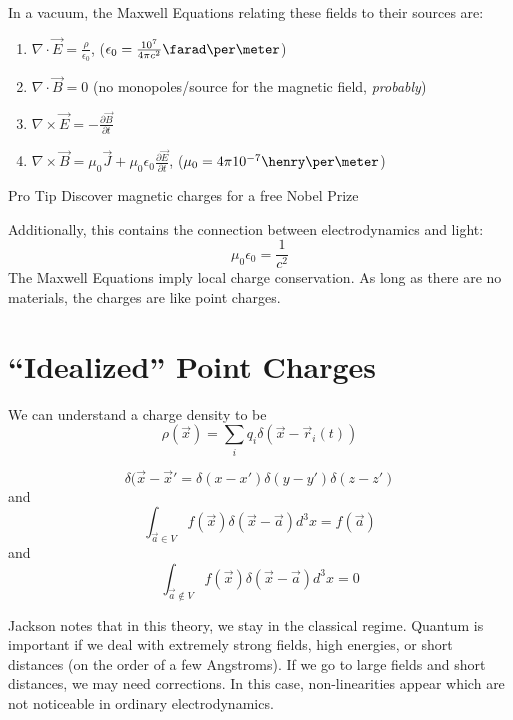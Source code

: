 \documentclass[twoside,master.tex]{subfiles}
\begin{document}
In a vacuum, the Maxwell Equations relating these fields to their sources are:
\begin{enumerate}
    \item $\nabla\cdot \vec{E} = \frac{\rho}{\epsilon_0}$, ($\epsilon_0 = \frac{10^{7}}{4\pi c^2}\farad\per\meter$)
    \item $\nabla \cdot \vec{B} = 0$ (no monopoles/source for the magnetic field, \textit{probably})
    \item $\nabla \times \vec{E} = -\frac{\partial \vec{B}}{\partial t}$
    \item $ \nabla \times \vec{B} = \mu_0 \vec{J} + \mu_0\epsilon_0 \frac{\partial \vec{E}}{\partial t}$, ($\mu_0 = 4\pi 10^{-7}\henry\per\meter$)
\end{enumerate}
\begin{note}{Pro Tip}
    Discover magnetic charges for a free Nobel Prize
\end{note}
Additionally, this contains the connection between electrodynamics and light:
\begin{equation}
    \mu_0\epsilon_0 = \frac{1}{c^2}
\end{equation}
The Maxwell Equations imply local charge conservation. As long as there are no materials, the charges are like point charges.

\section{``Idealized'' Point Charges}%
\label{sec:_idealized_point_charges_}
We can understand a charge density to be
\begin{equation}
    \rho(\vec{x}) = \sum_i q_i\delta(\vec{x}-\vec{r}_i(t))
\end{equation}
\begin{remark}
    \begin{equation}
        \delta(\vec{x}-\vec{x}' = \delta(x-x')\delta(y-y')\delta(z-z')
    \end{equation}
    and
    \begin{equation}
        \int_{\vec{a}\in V} f(\vec{x})\delta(\vec{x}-\vec{a})d^3x = f(\vec{a})
    \end{equation}
    and
    \begin{equation}
        \int_{\vec{a}\not\in V}f(\vec{x})\delta(\vec{x}-\vec{a})d^3x = 0
    \end{equation}
\end{remark}
Jackson notes that in this theory, we stay in the classical regime. Quantum is important if we deal with extremely strong fields, high energies, or short distances (on the order of a few Angstroms). If we go to large fields and short distances, we may need corrections. In this case, non-linearities appear which are not noticeable in ordinary electrodynamics.
\end{document}

